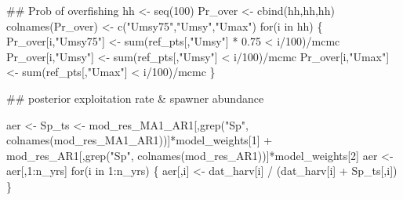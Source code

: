 \documentclass[
  11pt,
]{article}
\newenvironment{Shaded}{}{}
\newcommand{\CommentTok}[1]{\textcolor[rgb]{0.00,0.50,0.00}{#1}}
\newcommand{\ControlFlowTok}[1]{\textcolor[rgb]{0.00,0.00,1.00}{#1}}
\newcommand{\DecValTok}[1]{#1}
\newcommand{\FloatTok}[1]{#1}
\newcommand{\KeywordTok}[1]{\textcolor[rgb]{0.00,0.00,1.00}{#1}}
\newcommand{\NormalTok}[1]{#1}
\newcommand{\OperatorTok}[1]{#1}
\newcommand{\StringTok}[1]{\textcolor[rgb]{0.00,0.50,0.50}{#1}}
\begin{document}
\begin{Shaded}
\begin{Highlighting}[]
\CommentTok{## Prob of overfishing}
\NormalTok{hh <-}\StringTok{ }\KeywordTok{seq}\NormalTok{(}\DecValTok{100}\NormalTok{)}
\NormalTok{Pr_over <-}\StringTok{ }\KeywordTok{cbind}\NormalTok{(hh,hh,hh)}
\KeywordTok{colnames}\NormalTok{(Pr_over) <-}\StringTok{ }\KeywordTok{c}\NormalTok{(}\StringTok{"Umsy75"}\NormalTok{,}\StringTok{"Umsy"}\NormalTok{,}\StringTok{"Umax"}\NormalTok{)}
\ControlFlowTok{for}\NormalTok{(i }\ControlFlowTok{in}\NormalTok{ hh) \{}
\NormalTok{  Pr_over[i,}\StringTok{"Umsy75"}\NormalTok{] <-}\StringTok{ }\KeywordTok{sum}\NormalTok{(ref_pts[,}\StringTok{"Umsy"}\NormalTok{] }\OperatorTok{*}\StringTok{ }\FloatTok{0.75} \OperatorTok{<}\StringTok{ }\NormalTok{i}\OperatorTok{/}\DecValTok{100}\NormalTok{)}\OperatorTok{/}\NormalTok{mcmc}
\NormalTok{  Pr_over[i,}\StringTok{"Umsy"}\NormalTok{] <-}\StringTok{ }\KeywordTok{sum}\NormalTok{(ref_pts[,}\StringTok{"Umsy"}\NormalTok{] }\OperatorTok{<}\StringTok{ }\NormalTok{i}\OperatorTok{/}\DecValTok{100}\NormalTok{)}\OperatorTok{/}\NormalTok{mcmc}
\NormalTok{  Pr_over[i,}\StringTok{"Umax"}\NormalTok{] <-}\StringTok{ }\KeywordTok{sum}\NormalTok{(ref_pts[,}\StringTok{"Umax"}\NormalTok{] }\OperatorTok{<}\StringTok{ }\NormalTok{i}\OperatorTok{/}\DecValTok{100}\NormalTok{)}\OperatorTok{/}\NormalTok{mcmc}
\NormalTok{\}}

\CommentTok{## posterior exploitation rate & spawner abundance}

\NormalTok{aer <-}\StringTok{ }\NormalTok{Sp_ts <-}\StringTok{ }\NormalTok{mod_res_MA1_AR1[,}\KeywordTok{grep}\NormalTok{(}\StringTok{"Sp"}\NormalTok{, }\KeywordTok{colnames}\NormalTok{(mod_res_MA1_AR1))]}\OperatorTok{*}\NormalTok{model_weights[}\DecValTok{1}\NormalTok{] }\OperatorTok{+}\StringTok{ }\NormalTok{mod_res_AR1[,}\KeywordTok{grep}\NormalTok{(}\StringTok{"Sp"}\NormalTok{, }\KeywordTok{colnames}\NormalTok{(mod_res_AR1))]}\OperatorTok{*}\NormalTok{model_weights[}\DecValTok{2}\NormalTok{] }
\NormalTok{aer <-}\StringTok{ }\NormalTok{aer[,}\DecValTok{1}\OperatorTok{:}\NormalTok{n_yrs]}
\ControlFlowTok{for}\NormalTok{(i }\ControlFlowTok{in} \DecValTok{1}\OperatorTok{:}\NormalTok{n_yrs) \{}
\NormalTok{    aer[,i] <-}\StringTok{ }\NormalTok{dat_harv[i] }\OperatorTok{/}\StringTok{ }\NormalTok{(dat_harv[i] }\OperatorTok{+}\StringTok{ }\NormalTok{Sp_ts[,i]) }
\NormalTok{\}}
\end{Highlighting}
\end{Shaded}
\end{document}
